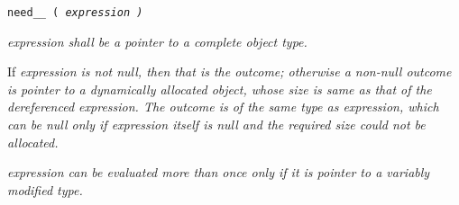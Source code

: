 
\tt{need__ (} \it{expression} \tt{)}


\it{expression} shall be a pointer to a complete object type.


If \it{expression} is not null, then that is the outcome;
otherwise a non-null outcome is pointer to a dynamically allocated object,
whose size is same as that of the dereferenced \it{expression}.
The outcome is of the same type as \it{expression}, which can be null only if
\it{expression} itself is null and the required size could not be allocated.

\it{expression} can be evaluated more than once
only if it is pointer to a variably modified type.
